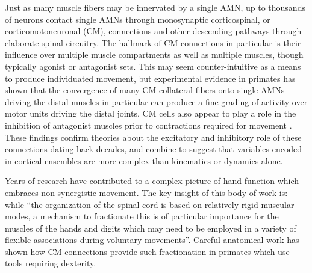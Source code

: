 \documentclass[../main.tex]{subfiles}
\begin{document}
Just as many muscle fibers may be innervated by a single AMN, up to thousands of neurons contact single AMNs through monosynaptic corticospinal, or corticomotoneuronal (CM), connections and other descending pathways through elaborate spinal circuitry. The hallmark of CM connections in particular is their influence over multiple muscle compartments as well as multiple muscles, though typically agonist or antagonist sets\cite{cheneyFunctionalClassesPrimate1980}. This may seem counter-intuitive as a means to produce individuated movement, but experimental evidence in primates has shown that the convergence of many CM collateral fibers onto single AMNs driving the distal muscles in particular can produce a fine grading of activity over motor units driving the distal joints. CM cells also appear to play a role in the inhibition of antagonist muscles prior to contractions required for movement \cite{griffinMotorCortexUses2020}. These findings confirm theories about the excitatory and inhibitory role of these connections dating back decades, and combine to suggest that variables encoded in cortical ensembles are more complex than kinematics or dynamics alone\cite{cheneyFunctionalClassesPrimate1980}.

Years of research have contributed to a complex picture of hand function which embraces non-synergistic movement. The key insight of this body of work is: while ``the organization of the spinal cord is based on relatively rigid muscular modes, a mechanism to fractionate this is of particular importance for the muscles of the hands and digits which may need to be employed in a variety of flexible associations during voluntary movements''\cite{lemonCorticalControlPrimate1993,lemonMechanismsCorticalControl1997,lemonDescendingPathwaysMotor2008}. Careful anatomical work has shown how CM connections provide such fractionation in primates which use tools requiring dexterity.
\end{document}
